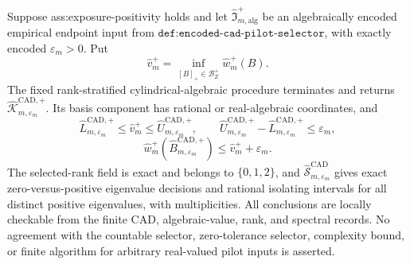 Suppose ass:exposure-positivity holds and let \(\widehat{\mathfrak I}_{m,\mathrm{alg}}^+\) be an algebraically encoded empirical endpoint input from \(\texttt{def:encoded-cad-pilot-selector}\), with exactly encoded \(\varepsilon_m>0\).  Put
\[
\widehat v_m^+=\inf_{[B]_+\in\mathcal B_Z^+}\widehat w_m^+(B).
\]
The fixed rank-stratified cylindrical-algebraic procedure terminates and returns \(\widehat{\mathscr K}_{m,\varepsilon_m}^{\mathrm{CAD},+}\).  Its basis component has rational or real-algebraic coordinates, and
\[
\widehat L_{m,\varepsilon_m}^{\mathrm{CAD},+}
\le\widehat v_m^+
\le\widehat U_{m,\varepsilon_m}^{\mathrm{CAD},+},
\qquad
\widehat U_{m,\varepsilon_m}^{\mathrm{CAD},+}
-\widehat L_{m,\varepsilon_m}^{\mathrm{CAD},+}
\le\varepsilon_m,
\]
\[
\widehat w_m^+(\widehat B_{m,\varepsilon_m}^{\mathrm{CAD},+})
\le\widehat v_m^++\varepsilon_m.
\]
The selected-rank field is exact and belongs to \(\{0,1,2\}\), and \(\widehat{\mathscr S}_{m,\varepsilon_m}^{\mathrm{CAD}}\) gives exact zero-versus-positive eigenvalue decisions and rational isolating intervals for all distinct positive eigenvalues, with multiplicities.  All conclusions are locally checkable from the finite CAD, algebraic-value, rank, and spectral records.  No agreement with the countable selector, zero-tolerance selector, complexity bound, or finite algorithm for arbitrary real-valued pilot inputs is asserted.